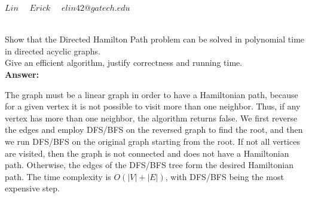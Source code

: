 \documentclass[a4paper,11pt]{article}
\begin{document}
\title{
}



\date{}


\newcommand{\DEF}[1]{{\em #1\/}}

\newcommand\chic{\chi_c}
\newcommand\C{\hbox{${\cal C}$}}
\newcommand{\RR}{\mbox{$\mathbb R$}}
\newcommand{\NN}{\mbox{$\mathbb N$}}
\newcommand{\ZZ}{\mbox{$\mathbb Z$}}
\newcommand{\eopf}{\raisebox{0.8ex}{\framebox{}}}
\newcommand{\dist}{\hbox{\rm d}}
\renewcommand\a{\alpha}
\renewcommand\b{\beta}
\renewcommand\c{\gamma}
\renewcommand\d{\delta}
\newcommand\D{\Delta}
\newcommand{\directedchi}{\mbox{$\vec{\chi}$}}
\newcommand{\directedE}{\mbox{$\vec{E}$}}
\newcommand{\directedG}{\mbox{$\vec{G}$}}
\newcommand{\directedK}{\mbox{$\vec{K}$}}

\newenvironment{proof}%
{\noindent{\bf Proof.}\ }%
{\hfill\eopf\par\bigskip}%



 $Lin \quad$
 $Erick \quad$
          $elin42@gatech.edu$\\

\bigskip

\\
Show that the Directed Hamilton Path problem can be solved in polynomial time in directed acyclic graphs. \\
Give an efficient algorithm, justify correctness and running time. \\
{\bf Answer:} \par
The graph must be a linear graph in order to have a Hamiltonian path, because for a given vertex it is not possible to visit more than one neighbor. Thus, if any vertex has more than one neighbor, the algorithm returns false. We first reverse the edges and employ DFS/BFS on the reversed graph to find the root, and then we run DFS/BFS on the original graph starting from the root. If not all vertices are visited, then the graph is not connected and does not have a Hamiltonian path. Otherwise, the edges of the DFS/BFS tree form the desired Hamiltonian path. The time complexity is $O(|V| + |E|)$, with DFS/BFS being the most expensive step.
\end{document}
